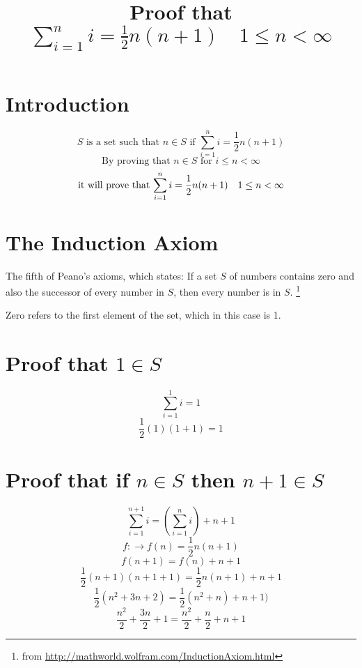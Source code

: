 \documentclass[11pt,fleqn,a4paper]{article}
\newcommand{\half}{\frac{1}{2}}
\newcommand{\mainEquation}{\( \sum\limits_{i=1}^{n} i = \half n(n+1) \quad 1 \leq n < \infty  \)}
\begin{document}
\title{Proof that \mainEquation}
\date{}
\maketitle

\section{Introduction}
\[ S \text{ is a set such that } n \in S \text{ if } \sum\limits_{i=1}^{n} i = \half n(n+1) \]
\[ \text{By proving that } n \in S \text{ for } i \leq n < \infty \]
 \[ \text{it will prove that \mainEquation } \]

\section{The Induction Axiom}
The fifth of Peano's axioms, which states: If a set \(S\) of numbers contains zero and also the successor of every number in \(S\), then every number is in \(S\). \footnote{from \url{http://mathworld.wolfram.com/InductionAxiom.html}}

Zero refers to the first element of the set, which in this case is 1. 

\section{Proof that \(1 \in S \)}
\[ \sum\limits_{i=1}^{1}i = 1 \]
\[ \half (1)(1 + 1) = 1 \]

\section{Proof that if \(n \in S \) then \( n + 1 \in S \)}
\[ \sum\limits_{i=1}^{n + 1}i = \left(\sum\limits_{i=1}^{n}i\right) + n + 1 \]
\[ f:\rightarrow f(n) = \half n(n+1) \]
\[ f(n + 1) = f(n) + n + 1\]
\[ \half (n + 1)(n + 1 + 1) = \half n(n + 1) + n + 1 \]
\[  \half (n^2 + 3n + 2) = \half (n^2 + n) + n + 1) \]
\[ \frac{n^2}{2} + \frac{3n}{2} + 1 = \frac{n^2}{2} + \frac{n}{2} + n + 1 \]
\end{document}
